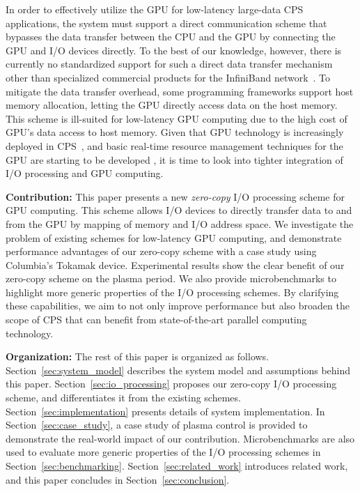 In order to effectively utilize the GPU for low-latency large-data CPS
applications, the system must support a direct communication scheme that
bypasses the data transfer between the CPU and the GPU by connecting the
GPU and I/O devices directly.
To the best of our knowledge, however, there is currently no
standardized support for such a direct data transfer mechanism other than
specialized commercial products for the InfiniBand
network~\cite{GPUDirect}.
To mitigate the data transfer overhead, some programming frameworks
support host memory allocation, letting the GPU directly access data on
the host memory.
This scheme is ill-suited for low-latency GPU computing due to the high
cost of GPU's data access to host memory.
Given that GPU technology is increasingly deployed in
CPS~\cite{Hirabayashi_REACTION12, Mangharam11, McNaughton_ICRA11,
Michel_IROS07}, 
and basic real-time resource management techniques for the GPU are
starting to be developed \cite{Elliott_RTS12, Elliott_ECRTS12, Kato_RTAS11,
Kato_RTSS11, Kato_ATC11, Kato_ATC12, Liu_PACT12}, it is time to look
into tighter integration of I/O processing and GPU computing.

\textbf{Contribution:}
This paper presents a new \emph{zero-copy} I/O processing scheme for GPU
computing.
This scheme allows I/O devices to directly transfer data to and from the
GPU by mapping of memory and I/O address space.
We investigate the problem of existing schemes for low-latency GPU
computing, and demonstrate performance advantages of our zero-copy
scheme with a case study using Columbia's Tokamak device.
Experimental results show the clear benefit of our zero-copy scheme on
the plasma period.
We also provide microbenchmarks to highlight more generic
properties of the I/O processing schemes.
By clarifying these capabilities, we aim to not only improve performance
but also broaden the scope of CPS that can benefit from state-of-the-art
parallel computing technology.

\textbf{Organization:}
The rest of this paper is organized as follows.
Section~\ref{sec:system_model} describes the system model and
assumptions behind this paper.
Section~\ref{sec:io_processing} proposes our zero-copy I/O processing
scheme, and differentiates it from the existing schemes.
Section~\ref{sec:implementation} presents details of system
implementation.
In Section~\ref{sec:case_study}, a case study of plasma control is
provided to demonstrate the real-world impact of our contribution.
Microbenchmarks are also used to evaluate more generic properties of the
I/O processing schemes in Section~\ref{sec:benchmarking}.
Section~\ref{sec:related_work} introduces related work, and this paper
concludes in Section~\ref{sec:conclusion}.